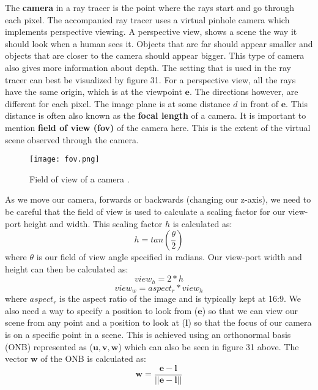 \documentclass[11pt,a4paper]{article}
\begin{document}
	The \textbf{camera} in a ray tracer is the point where the rays start and go through each pixel. The accompanied ray tracer uses a virtual pinhole camera which implements perspective viewing. A perspective view, shows a scene the way it should look when a human sees it. Objects that are far should appear smaller and objects that are closer to the camera should appear bigger. This type of camera also gives more information about depth. The setting that is used in the ray tracer can best be visualized by figure 31.
	For a perspective view, all the rays have the same origin, which is at the viewpoint $\boldsymbol{e}$. The directions however, are different for each pixel. The image plane is at some distance $d$ in front of $\boldsymbol{e}$. This distance is often also known as the \textbf{focal length} of a camera. It is important to mention \textbf{field of view (fov)} of the camera here. This is the extent of the virtual scene observed through the camera. 
	\begin{figure}[H]
		\centering
		\captionsetup{justification=centering}
		\texttt{[image: fov.png]}\quad
		\caption{Field of view of a camera \protect\cite{fieldofview}.}
	\end{figure}
	\noindent
	As we move our camera, forwards or backwards (changing our z-axis), we need to be careful that the field of view is used to calculate a scaling factor for our view-port height and width. This scaling factor $h$ is calculated as:
	\begin{equation}
		h = tan\left(\frac{\theta}{2}\right)
	\end{equation}
	\noindent
	where $\theta$ is our field of view angle specified in radians. Our view-port width and height can then be calculated as:
	\begin{equation}
		view_{h} = 2 * h
	\end{equation}
	\begin{equation}
		view_{w} = aspect_{r} * view_{h}
	\end{equation}
	\noindent
	where $aspect_{r}$ is the aspect ratio of the image and is typically kept at 16:9. We also need a way to specify a position to look from ($\boldsymbol{e}$) so that we can view our scene from any point and a position to look at ($\boldsymbol{l}$) so that the focus of our camera is on a specific point in a scene. This is achieved using an orthonormal basis (ONB) represented as ($\boldsymbol{u, v, w}$) which can also be seen in figure 31 above. The vector $\boldsymbol{w}$ of the ONB is calculated as:
	\begin{equation}
		\boldsymbol{w} = \frac{\boldsymbol{e} - \boldsymbol{l}}{||\boldsymbol{e} - \boldsymbol{l}||}
	\end{equation}
\end{document}

